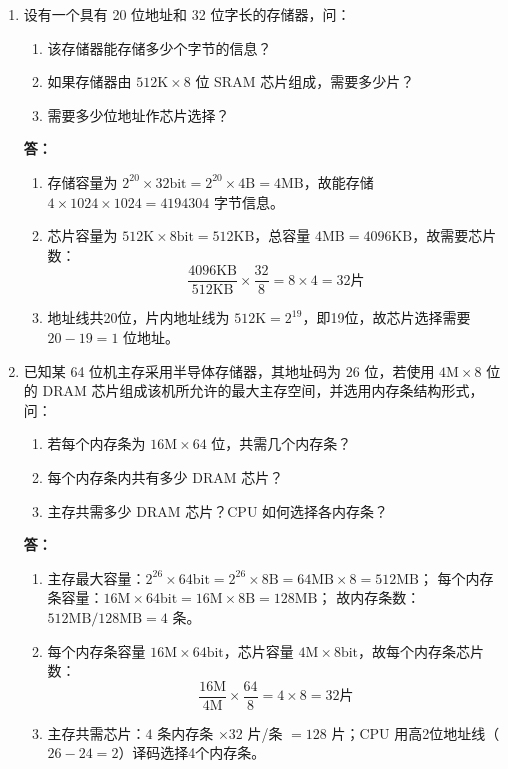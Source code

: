 \documentclass{article}
\begin{document}
\begin{enumerate}[label=\arabic*.]
    \item 设有一个具有 20 位地址和 32 位字长的存储器，问：
    \begin{enumerate}[label=(\arabic*)]
        \item 该存储器能存储多少个字节的信息？
        \item 如果存储器由 $512\text{K}\times8$ 位 SRAM 芯片组成，需要多少片？
        \item 需要多少位地址作芯片选择？
    \end{enumerate}
    
    \textbf{答：}
    \begin{enumerate}[label=(\arabic*)]
        \item 存储容量为 $2^{20} \times 32\text{bit} = 2^{20} \times 4\text{B} = 4\text{MB}$，故能存储 $4\times1024\times1024=4194304$ 字节信息。
        \item 芯片容量为 $512\text{K}\times8\text{bit}=512\text{KB}$，总容量 $4\text{MB}=4096\text{KB}$，故需要芯片数：
        \[
        \frac{4096\text{KB}}{512\text{KB}} \times \frac{32}{8} = 8 \times 4 = 32 \text{片}
        \]
        \item 地址线共20位，片内地址线为 $512\text{K}=2^{19}$，即19位，故芯片选择需要 $20-19=1$ 位地址。
    \end{enumerate}

    \item 已知某 64 位机主存采用半导体存储器，其地址码为 26 位，若使用 $4\text{M}\times8$ 位的 DRAM 芯片组成该机所允许的最大主存空间，并选用内存条结构形式，问：
    \begin{enumerate}[label=(\arabic*)]
        \item 若每个内存条为 $16\text{M}\times64$ 位，共需几个内存条？
        \item 每个内存条内共有多少 DRAM 芯片？
        \item 主存共需多少 DRAM 芯片？CPU 如何选择各内存条？
    \end{enumerate}
    
    \textbf{答：}
    \begin{enumerate}[label=(\arabic*)]
        \item 主存最大容量：$2^{26}\times64\text{bit}=2^{26}\times8\text{B}=64\text{MB}\times8=512\text{MB}$；
        每个内存条容量：$16\text{M}\times64\text{bit}=16\text{M}\times8\text{B}=128\text{MB}$；
        故内存条数：$512\text{MB}/128\text{MB}=4$ 条。
        \item 每个内存条容量 $16\text{M}\times64\text{bit}$，芯片容量 $4\text{M}\times8\text{bit}$，故每个内存条芯片数：
        \[
        \frac{16\text{M}}{4\text{M}} \times \frac{64}{8} = 4 \times 8 = 32 \text{片}
        \]
        \item 主存共需芯片：$4$ 条内存条 $\times 32$ 片/条 $=128$ 片；CPU 用高2位地址线（$26-24=2$）译码选择4个内存条。
    \end{enumerate}


\end{enumerate}
\end{document}
